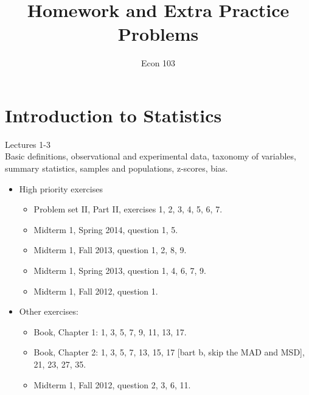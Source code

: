 \documentclass[11pt]{article}
\title{Homework and Extra Practice Problems}
\author{Econ 103}
\begin{document}
\maketitle

\section{Introduction to Statistics}
Lectures 1-3\\[0.2in]
Basic definitions, observational and experimental data, taxonomy of variables, summary statistics, samples and populations, z-scores, bias. 
	\begin{itemize}
	\item High priority exercises
	\begin{itemize}
		\item  Problem set II, Part II, exercises 1, 2, 3, 4, 5, 6, 7.
		\item Midterm 1, Spring 2014, question 1, 5.
		\item Midterm 1, Fall 2013, question 1, 2, 8, 9.
		\item Midterm 1, Spring 2013, question 1, 4, 6, 7, 9.
		\item Midterm 1, Fall 2012, question 1. 
	\end{itemize} 
	\item Other exercises:
	\begin{itemize}
		\item Book, Chapter 1: 1, 3, 5, 7, 9, 11, 13, 17.
		\item Book, Chapter 2: 1, 3, 5, 7, 13, 15, 17 [bart b, skip the MAD and MSD], 21, 23, 27, 35. 
		\item Midterm 1, Fall 2012, question 2, 3, 6, 11.
	\end{itemize}
	\end{itemize}
	
\end{document}
